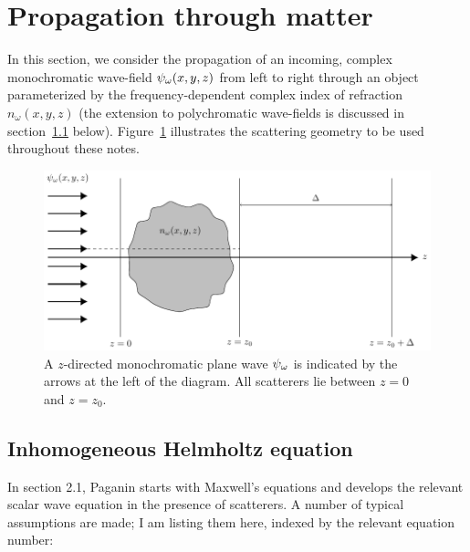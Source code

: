 \documentclass{article}
\begin{document}
\section{Propagation through matter}\label{matter}
In this section, we consider the propagation of an incoming, complex
monochromatic wave-field $\psi_{\omega}(x,y,z)$ from left to right through an object
parameterized by the frequency-dependent complex index of refraction
$n_{\omega}(x,y,z)$ (the extension to polychromatic wave-fields is discussed in
section~\ref{helmholtz} below). Figure~\ref{fig:proj} illustrates the scattering
geometry to be used throughout these notes.

\begin{figure}[h]
  \centering
  \includegraphics{figs/projfig}
  \captionsetup{width=0.6\linewidth}
  \caption{A $z$-directed monochromatic plane wave $\psi_{\omega}$ is indicated
    by the arrows at the left of the diagram. All scatterers lie between $z=0$
    and $z=z_0$.}
  \label{fig:proj}
\end{figure}

\subsection{Inhomogeneous Helmholtz equation}\label{helmholtz}
In section 2.1, Paganin starts with Maxwell's equations and develops the
relevant scalar wave equation in the presence of scatterers. A number of typical
assumptions are made; I am listing them here, indexed by the relevant equation
number:
\end{document}
